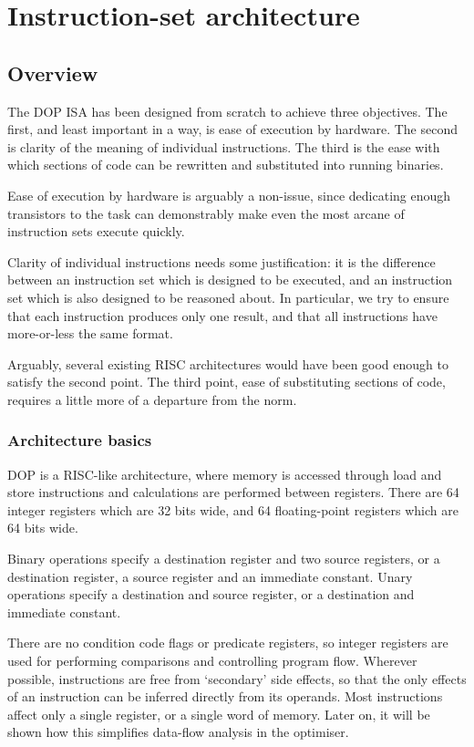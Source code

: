 \chapter{Instruction-set architecture}

\section{Overview}

The DOP ISA has been designed from scratch to achieve three objectives. The first, and least important in a way, is ease of execution by hardware. The second is clarity of the meaning of individual instructions. The third is the ease with which sections of code can be rewritten and substituted into running binaries.

Ease of execution by hardware is arguably a non-issue, since dedicating enough transistors to the task can demonstrably make even the most arcane of instruction sets execute quickly.

Clarity of individual instructions needs some justification: it is the difference between an instruction set which is designed to be executed, and an instruction set which is also designed to be reasoned about. In particular, we try to ensure that each instruction produces only one result, and that all instructions have more-or-less the same format.

Arguably, several existing RISC architectures would have been good enough to satisfy the second point. The third point, ease of substituting sections of code, requires a little more of a departure from the norm.

\subsection{Architecture basics}

DOP is a RISC-like architecture, where memory is accessed through load and store instructions and calculations are performed between registers. There are 64 integer registers which are 32 bits wide, and 64 floating-point registers which are 64 bits wide.

Binary operations specify a destination register and two source registers, or a destination register, a source register and an immediate constant. Unary operations specify a destination and source register, or a destination and immediate constant.

There are no condition code flags or predicate registers, so integer registers are used for performing comparisons and controlling program flow. Wherever possible, instructions are free from `secondary' side effects, so that the only effects of an instruction can be inferred directly from its operands. Most instructions affect only a single register, or a single word of memory. Later on, it will be shown how this simplifies data-flow analysis in the optimiser.

